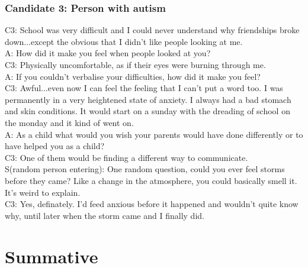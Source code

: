 \subsection{Candidate 3: Person with autism}
C3: School was very difficult and I could never understand why friendships broke down...except the obvious that I didn’t like people looking at me. \\
A: How did it make you feel when people looked at you?\\
C3: Physically uncomfortable, as if their eyes were burning through me.\\
A: If you couldn’t verbalise your difficulties, how did it make you feel?\\
C3: Awful...even now I can feel the feeling that I can’t put a word too. I was permanently in a very heightened state of anxiety. I always had a bad stomach and skin conditions. It would start on a sunday with the dreading of school on the monday and it kind of went on. \\
A: As a child what would you wish your parents would have done differently or to have helped you as a child?\\
C3: One of them would be finding a different way to communicate.\\
S(random person entering): One random question, could you ever feel storms before they came? Like a change in the atmosphere, you could basically smell it. It’s weird to explain.\\
C3: Yes, definately. I’d feed anxious before it happened and wouldn’t quite know why, until later when the storm came and I finally did.\\

\chapter{Summative}
\label{sec:appendix_summative}

